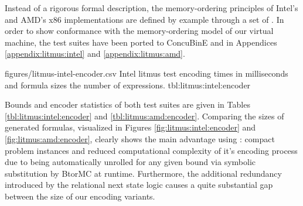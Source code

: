 Instead of a rigorous formal description, the memory-ordering principles of Intel's \cite{ref:Intel} and AMD's \cite{ref:AMD} x86 implementations are defined by example through a set of .
In order to show conformance with the memory-ordering model of our virtual machine, the test suites have been ported to ConcuBinE and  in Appendices \ref{appendix:litmus:intel} and \ref{appendix:litmus:amd}.



\newcommand{\IntelRowHeader}[1]{\hyperref[tbl:litmus:intel:#1]{#1}}
\newcommand{\AMDRowHeader}[1]{\hyperref[tbl:litmus:amd:#1]{#1}}

\EncoderStatsTable
  {figures/litmus-intel-encoder.csv}
  {\textnumero}
  {\IntelRowHeader}
  {Intel litmus test encoding times in milliseconds and formula sizes  the number of expressions.}
  {tbl:litmus:intel:encoder}


Bounds and encoder statistics of both test suites are given in Tables \ref{tbl:litmus:intel:encoder} and \ref{tbl:litmus:amd:encoder}.
Comparing the sizes of generated formulas, visualized in Figures \ref{fig:litmus:intel:encoder} and \ref{fig:litmus:amd:encoder}, clearly shows the main advantage  using {\BTOR}:
compact problem instances and reduced computational complexity of it's encoding process
due to being automatically unrolled for any given bound via symbolic substitution by BtorMC at runtime.
Furthermore, the additional redundancy introduced by the relational next state logic causes a quite substantial gap between the size of our {\SMTLIB} encoding variants.


